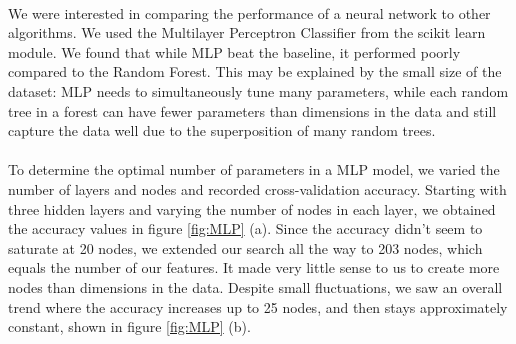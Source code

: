 \documentclass[11pt]{article}
\begin{document}
\paragraph{}We were interested in comparing the performance of a neural network to other algorithms. We used the Multilayer Perceptron Classifier from the scikit learn module. We found that while MLP beat the baseline, it performed poorly compared to the Random Forest. This may be explained by the small size of the dataset: MLP needs to simultaneously tune many parameters, while each random tree in a forest can have fewer parameters than dimensions in the data and still capture the data well due to the superposition of many random trees.
\paragraph{}To determine the optimal number of parameters in a MLP model, we varied the number of layers and nodes and recorded cross-validation accuracy. Starting with three hidden layers and varying the number of nodes in each layer, we obtained the accuracy values in figure \ref{fig:MLP} (a). Since the accuracy didn't seem to saturate at 20 nodes, we extended our search all the way to 203 nodes, which equals the number of our features. It made very little sense to us to create more nodes than dimensions in the data. Despite small fluctuations, we saw an overall trend where the accuracy increases up to 25 nodes, and then stays approximately constant, shown in figure \ref{fig:MLP} (b). 
\end{document}
